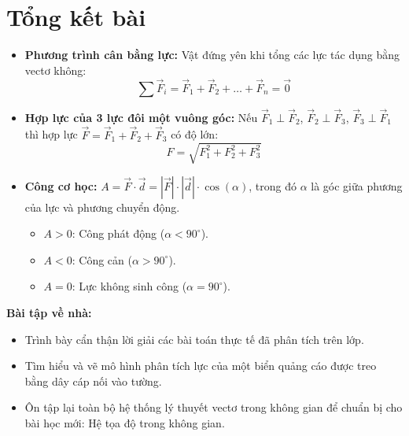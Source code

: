 \documentclass[12pt]{article}
\begin{document}
	
	
	\newpage
	
	\section{Tổng kết bài}
	
	\begin{tcolorbox}[colback=yellow!10!white, colframe=orange!60!black,
		fonttitle=\bfseries, title={Tóm tắt các công thức ứng dụng thực tế}]
		\begin{itemize}
			\item \textbf{Phương trình cân bằng lực:} Vật đứng yên khi tổng các lực tác dụng bằng vectơ không:
			$$ \sum \vec{F}_i = \vec{F}_1 + \vec{F}_2 + \dots + \vec{F}_n = \vec{0} $$
			\item \textbf{Hợp lực của 3 lực đôi một vuông góc:} Nếu $\vec{F}_1 \perp \vec{F}_2$, $\vec{F}_2 \perp \vec{F}_3$, $\vec{F}_3 \perp \vec{F}_1$ thì hợp lực $\vec{F} = \vec{F}_1 + \vec{F}_2 + \vec{F}_3$ có độ lớn:
			$$ F = \sqrt{F_1^2 + F_2^2 + F_3^2} $$
			\item \textbf{Công cơ học:} $A = \vec{F} \cdot \vec{d} = |\vec{F}| \cdot |\vec{d}| \cdot \cos(\alpha)$, trong đó $\alpha$ là góc giữa phương của lực và phương chuyển động.
			\begin{itemize}
				\item $A > 0$: Công phát động ($\alpha < 90^\circ$).
				\item $A < 0$: Công cản ($\alpha > 90^\circ$).
				\item $A = 0$: Lực không sinh công ($\alpha = 90^\circ$).
			\end{itemize}
		\end{itemize}
	\end{tcolorbox}
	
	\vspace{5mm}
	\textbf{Bài tập về nhà:}
	\begin{itemize}
		\item Trình bày cẩn thận lời giải các bài toán thực tế đã phân tích trên lớp.
		\item Tìm hiểu và vẽ mô hình phân tích lực của một biển quảng cáo được treo bằng dây cáp nối vào tường.
		\item Ôn tập lại toàn bộ hệ thống lý thuyết vectơ trong không gian để chuẩn bị cho bài học mới: Hệ tọa độ trong không gian.
	\end{itemize}
	
\end{document}
